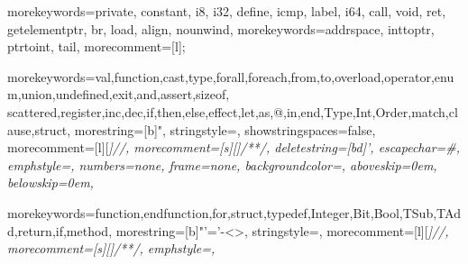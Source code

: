 \let\ea\expandafter

\usepackage[scaled=0.82]{beramono}




\usepackage[colorlinks]{hyperref}
\usepackage[toc,nonumberlist]{glossaries}
\usepackage[nottoc]{tocbibind}
\usepackage[capitalise]{cleveref}
\usepackage{footnote}
\usepackage{threeparttable}
{
	morekeywords={private, constant, i8, i32, define, icmp, label, i64, call, void, ret, getelementptr, br, load, align, nounwind},
	morekeywords={addrspace, inttoptr, ptrtoint, tail},
	morecomment=[l];
}%

  { morekeywords={val,function,cast,type,forall,foreach,from,to,overload,operator,enum,union,undefined,exit,and,assert,sizeof,
      scattered,register,inc,dec,if,then,else,effect,let,as,@,in,end,Type,Int,Order,match,clause,struct},
    morestring=[b]",
    stringstyle={\ttfamily\color{red}},
    showstringspaces=false,
    morecomment=[l][\itshape\color{DarkGreen}]{//},
    morecomment=[s][\itshape\color{DarkGreen}]{/*}{*/},
    deletestring=[bd]{'},
    escapechar=\#,
    emphstyle={\it},
    numbers=none,
    frame=none,
    backgroundcolor=\color{White},
    aboveskip=0em,
    belowskip=0em,
  }

{ morekeywords={function,endfunction,for,struct,typedef,Integer,Bit,Bool,TSub,TAdd,return,if,method},
  morestring=[b]"'=’-<>,
  stringstyle={\ttfamily\color{red}},
  morecomment=[l][\itshape\color{DarkGreen}]{//},
  morecomment=[s][\itshape\color{DarkGreen}]{/*}{*/},
  emphstyle={\it},
}

